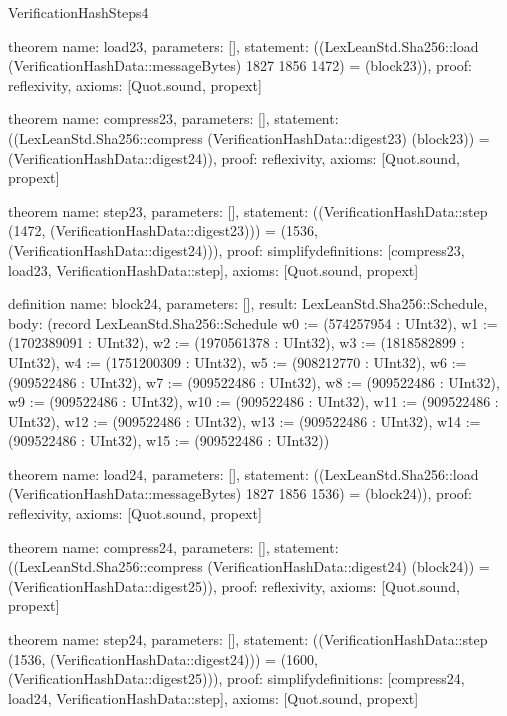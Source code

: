 \begin{lexlean}{VerificationHashSteps4}
\begin{semanticmodule}
theorem{
  name: load23,
  parameters: [],
  statement: ((LexLeanStd.Sha256::load (VerificationHashData::messageBytes) 1827 1856 1472) = (block23)),
  proof: reflexivity{},
  axioms: [Quot.sound, propext]
}

theorem{
  name: compress23,
  parameters: [],
  statement: ((LexLeanStd.Sha256::compress (VerificationHashData::digest23) (block23)) = (VerificationHashData::digest24)),
  proof: reflexivity{},
  axioms: [Quot.sound, propext]
}

theorem{
  name: step23,
  parameters: [],
  statement: ((VerificationHashData::step (1472, (VerificationHashData::digest23))) = (1536, (VerificationHashData::digest24))),
  proof: simplify{definitions: [compress23, load23, VerificationHashData::step]},
  axioms: [Quot.sound, propext]
}

definition{
  name: block24,
  parameters: [],
  result: LexLeanStd.Sha256::Schedule,
  body: (record LexLeanStd.Sha256::Schedule {w0 := (574257954 : UInt32), w1 := (1702389091 : UInt32), w2 := (1970561378 : UInt32), w3 := (1818582899 : UInt32), w4 := (1751200309 : UInt32), w5 := (908212770 : UInt32), w6 := (909522486 : UInt32), w7 := (909522486 : UInt32), w8 := (909522486 : UInt32), w9 := (909522486 : UInt32), w10 := (909522486 : UInt32), w11 := (909522486 : UInt32), w12 := (909522486 : UInt32), w13 := (909522486 : UInt32), w14 := (909522486 : UInt32), w15 := (909522486 : UInt32)})
}

theorem{
  name: load24,
  parameters: [],
  statement: ((LexLeanStd.Sha256::load (VerificationHashData::messageBytes) 1827 1856 1536) = (block24)),
  proof: reflexivity{},
  axioms: [Quot.sound, propext]
}

theorem{
  name: compress24,
  parameters: [],
  statement: ((LexLeanStd.Sha256::compress (VerificationHashData::digest24) (block24)) = (VerificationHashData::digest25)),
  proof: reflexivity{},
  axioms: [Quot.sound, propext]
}

theorem{
  name: step24,
  parameters: [],
  statement: ((VerificationHashData::step (1536, (VerificationHashData::digest24))) = (1600, (VerificationHashData::digest25))),
  proof: simplify{definitions: [compress24, load24, VerificationHashData::step]},
  axioms: [Quot.sound, propext]
}

\end{semanticmodule}
\end{lexlean}
